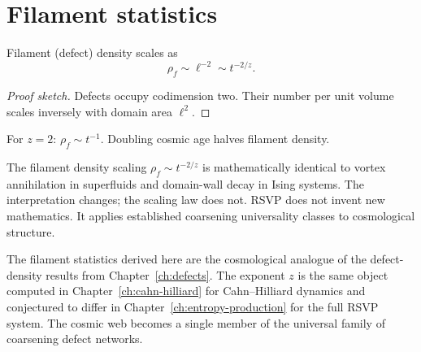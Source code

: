 \section{Filament statistics}

\begin{proposition}
  \label{prop:filament-density}
  \statusconjectured{}
  Filament (defect) density scales as
  \[
    \rho_f \sim \ell^{-2} \sim t^{-2/z}.
  \]
\end{proposition}

\begin{proof}[Proof sketch]
  Defects occupy codimension two.
  Their number per unit volume scales inversely with domain area
  $\ell^2$.
\end{proof}

\begin{WorkedExample}[Filament decay for $z=2$]
  For $z = 2$: $\rho_f \sim t^{-1}$.
  Doubling cosmic age halves filament density.
\end{WorkedExample}

\begin{NotUnique}
  The filament density scaling $\rho_f \sim t^{-2/z}$ is
  mathematically identical to vortex annihilation in superfluids
  and domain-wall decay in Ising systems.
  The interpretation changes; the scaling law does not.
  RSVP does not invent new mathematics.
  It applies established coarsening universality classes to
  cosmological structure.
\end{NotUnique}

\begin{ChapterConnection}
  The filament statistics derived here are the cosmological
  analogue of the defect-density results from
  Chapter~\ref{ch:defects}.
  The exponent $z$ is the same object computed in
  Chapter~\ref{ch:cahn-hilliard} for Cahn--Hilliard dynamics
  and conjectured to differ in Chapter~\ref{ch:entropy-production}
  for the full RSVP system.
  The cosmic web becomes a single member of the universal family
  of coarsening defect networks.
\end{ChapterConnection}

\begin{ProblemSet}
\end{ProblemSet}
